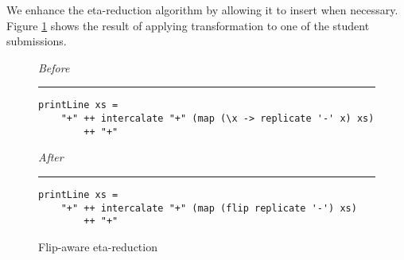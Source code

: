 
We enhance the eta-reduction algorithm by allowing it to insert  when necessary. Figure \ref{fig:misc-eta-flip} shows the result of applying transformation to one of the student submissions.

\begin{figure}
\centering
\emph{Before}
\noindent\rule{\linewidth}{0.5pt}
\begin{verbatim}
printLine xs =
    "+" ++ intercalate "+" (map (\x -> replicate '-' x) xs)
        ++ "+"
\end{verbatim}
\bigskip
\emph{After}
\noindent\rule{\linewidth}{0.5pt}
\begin{verbatim}
printLine xs =
    "+" ++ intercalate "+" (map (flip replicate '-') xs)
        ++ "+"
\end{verbatim}
\bigskip
\caption{Flip-aware eta-reduction}
\label{fig:misc-eta-flip}
\end{figure}
